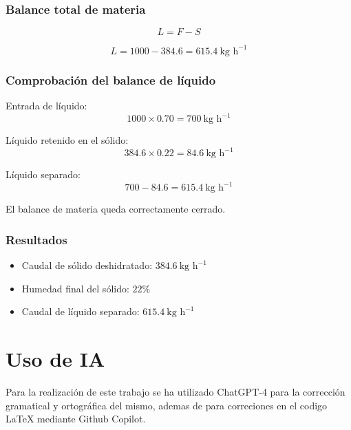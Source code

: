\documentclass{report}
\begin{document}
\subsubsection{Balance total de materia}

\begin{equation}
L = F - S
\end{equation}

\begin{equation}
L = 1000 - 384.6 = 615.4\ \text{kg h}^{-1}
\end{equation}



\subsubsection{Comprobación del balance de líquido}

Entrada de líquido:
\begin{equation}
1000 \times 0.70 = 700\ \text{kg h}^{-1}
\end{equation}

Líquido retenido en el sólido:
\begin{equation}
384.6 \times 0.22 = 84.6\ \text{kg h}^{-1}
\end{equation}

Líquido separado:
\begin{equation}
700 - 84.6 = 615.4\ \text{kg h}^{-1}
\end{equation}

El balance de materia queda correctamente cerrado.



\subsubsection{Resultados}

\begin{itemize}
    \item Caudal de sólido deshidratado: $384.6\ \text{kg h}^{-1}$
    \item Humedad final del sólido: $22\%$
    \item Caudal de líquido separado: $615.4\ \text{kg h}^{-1}$
\end{itemize}
\section{Uso de IA}
Para la realización de este trabajo se ha utilizado ChatGPT-4 para la corrección gramatical y ortográfica del mismo, ademas de para correciones en el codigo LaTeX mediante Github Copilot.
\printbibliography[heading=bibintoc, title={Bibliografía}]

\end{document}
